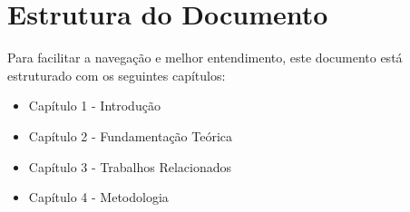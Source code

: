 \section{Estrutura do Documento}

Para facilitar a navegação e melhor entendimento, este documento está estruturado com os seguintes capítulos:
\begin{itemize}
\item {Capítulo 1 - Introdução} 
\item {Capítulo 2 - Fundamentação Teórica}
\item {Capítulo 3 - Trabalhos Relacionados}
\item {Capítulo 4 - Metodologia}
\end{itemize}
